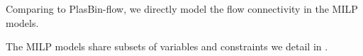 \begin{newfeatbox}
  Comparing to PlasBin-flow, we directly model the flow connectivity in the MILP models.
\end{newfeatbox}

The MILP models share subsets of variables and constraints we detail in .

%
%




%
%






%
%


% 
